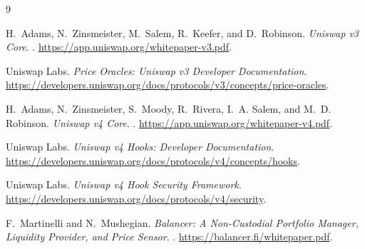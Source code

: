 \documentclass[11pt]{article}
\begin{document}
{\small
\begin{thebibliography}{9}

H.~Adams, N.~Zinsmeister, M.~Salem, R.~Keefer, and D.~Robinson.
\newblock \emph{Uniswap v3 Core}.
. \url{https://app.uniswap.org/whitepaper-v3.pdf}.

Uniswap Labs.
\newblock \emph{Price Oracles: Uniswap v3 Developer Documentation}.
\newblock \url{https://developers.uniswap.org/docs/protocols/v3/concepts/price-oracles}.

H.~Adams, N.~Zinsmeister, S.~Moody, R.~Rivera, I.~A. Salem, and M.~D. Robinson.
\newblock \emph{Uniswap v4 Core}.
. \url{https://app.uniswap.org/whitepaper-v4.pdf}.

Uniswap Labs.
\newblock \emph{Uniswap v4 Hooks: Developer Documentation}.
\newblock \url{https://developers.uniswap.org/docs/protocols/v4/concepts/hooks}.

Uniswap Labs.
\newblock \emph{Uniswap v4 Hook Security Framework}.
\newblock \url{https://developers.uniswap.org/docs/protocols/v4/security}.

F.~Martinelli and N.~Mushegian.
\newblock \emph{Balancer: A Non-Custodial Portfolio Manager, Liquidity Provider,
and Price Sensor}.
. \url{https://balancer.fi/whitepaper.pdf}.

\end{thebibliography}
}
\end{document}
